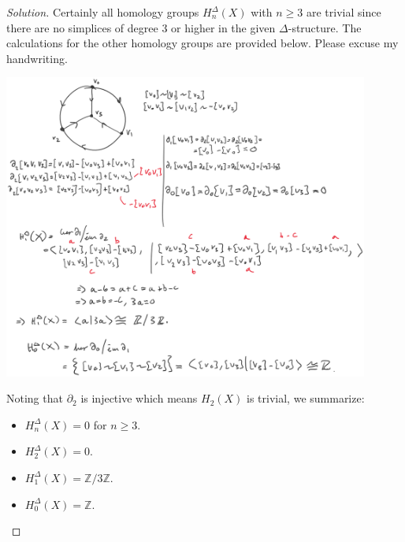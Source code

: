 \begin{proof}[Solution]
Certainly all homology groups $H_n^\Delta(X)$ with $n\geq 3$ are trivial since there are no simplices of degree 3 or higher in the given $\Delta$-structure. The calculations for the other homology groups are provided below. Please excuse my handwriting.

\begin{center}
  \includegraphics[width = 0.9\textwidth]{assignment2.png}
\end{center}

Noting that $\partial_2$ is injective which means $H_2(X)$ is trivial, we summarize:

\begin{itemize}
  \item $H_n^\Delta(X) = 0$ for $n \geq 3$.
  \item $H_2^\Delta(X) = 0$.
  \item $H_1^\Delta(X) = \mathbb{Z} / 3\mathbb{Z}$.
  \item $H_0^\Delta(X) = \mathbb{Z}$.
\end{itemize}



\end{proof}

\newpage

